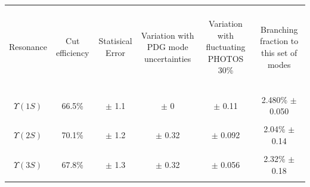 \documentclass[landscape]{article}
\begin{document}
\begin{center}
  \begin{tabular}{c | c c c c | c}
    \hline\hline
    & & & & & \\
    \begin{minipage}{3 cm} \begin{center} Resonance \end{center} \end{minipage} &
    \begin{minipage}{2 cm} \begin{center} Cut efficiency \end{center} \end{minipage} &
    \begin{minipage}{2 cm} \begin{center} Statisical Error \end{center} \end{minipage} &
    \begin{minipage}{4 cm} \begin{center} Variation with PDG mode uncertainties \end{center} \end{minipage} &
    \begin{minipage}{4 cm} \begin{center} Variation with fluctuating PHOTOS 30\% \end{center} \end{minipage} &
    \begin{minipage}{3 cm} \begin{center} Branching fraction to this set of modes \end{center} \end{minipage} \\
    & & & & & \\\hline
    & & & & & \\
    $\Upsilon(1S)$ & 66.5\% & $\pm$ 1.1 & $\pm$ 0 & $\pm$ 0.11 & 2.480\% $\pm$ 0.050 \\
    & & & & & \\
    $\Upsilon(2S)$ & 70.1\% & $\pm$ 1.2 & $\pm$ 0.32 & $\pm$ 0.092 & 2.04\% $\pm$ 0.14 \\
    & & & & & \\
    $\Upsilon(3S)$ & 67.8\% & $\pm$ 1.3 & $\pm$ 0.32 & $\pm$ 0.056 & 2.32\% $\pm$ 0.18 \\
    & & & & & \\\hline\hline
  \end{tabular}
\end{center}
\end{document}
